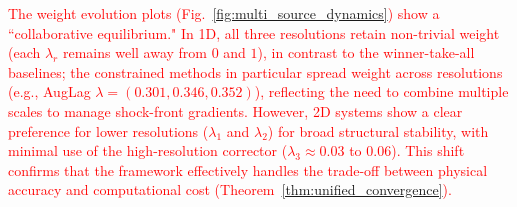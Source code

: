 \documentclass[preprint,12pt,authoryear]{elsarticle}
\begin{document}
\textcolor{red}{The weight evolution plots (Fig.~\ref{fig:multi_source_dynamics}) show a ``collaborative equilibrium." In 1D, all three resolutions retain non-trivial weight (each $\lambda_r$ remains well away from $0$ and $1$), in contrast to the winner-take-all baselines; the constrained methods in particular spread weight across resolutions (e.g., AugLag $\lambda = (0.301, 0.346, 0.352)$), reflecting the need to combine multiple scales to manage shock-front gradients. However, 2D systems show a clear preference for lower resolutions ($\lambda_1$ and $\lambda_2$) for broad structural stability, with minimal use of the high-resolution corrector ($\lambda_3 \approx 0.03$ to $0.06$). This shift confirms that the framework effectively handles the trade-off between physical accuracy and computational cost (Theorem~\ref{thm:unified_convergence}).}
\end{document}
